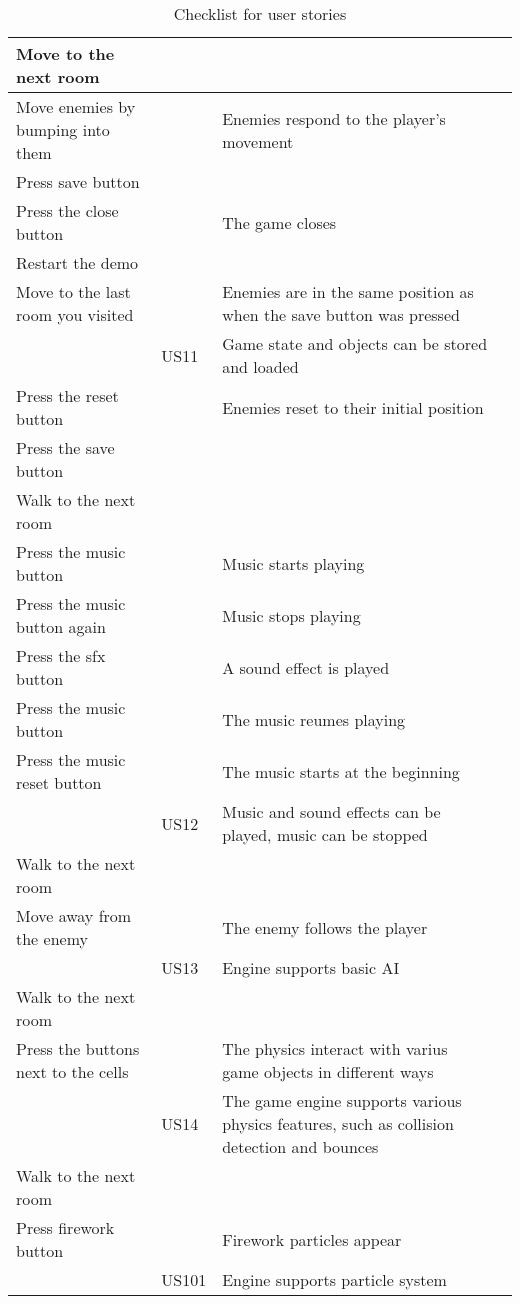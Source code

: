 \documentclass{article}
\begin{document}
\begin{table}[H]
\begin{tabular}{|p{3cm}|p{3cm}|p{6cm}|p{3cm}|}
Move to the next room & & & \\ \hline
Move enemies by bumping into them & & Enemies respond to the player's movement & \\ \hline
Press save button & & & \\ \hline
Press the close button & & The game closes & \\ \hline
Restart the demo & & & \\ \hline
Move to the last room you visited & & Enemies are in the same position as when the save button was pressed & \\ \hline
& US11 & Game state and objects can be stored and loaded & \\ \hline
Press the reset button & & Enemies reset to their initial position & \\ \hline
Press the save button & & & \\ \hline
Walk to the next room & & & \\ \hline
Press the music button & & Music starts playing & \\ \hline
Press the music button again & & Music stops playing & \\ \hline
Press the sfx button & & A sound effect is played & \\ \hline
Press the music button & & The music reumes playing & \\ \hline
Press the music reset button & & The music starts at the beginning & \\ \hline
& US12 & Music and sound effects can be played, music can be stopped & \\ \hline
Walk to the next room & & & \\ \hline
Move away from the enemy & & The enemy follows the player & \\ \hline
& US13 & Engine supports basic AI & \\ \hline
Walk to the next room & & & \\ \hline
Press the buttons next to the cells & & The physics interact with varius game objects in different ways & \\ \hline
& US14 & The game engine supports various physics features, such as collision detection and bounces & \\ \hline
Walk to the next room & & & \\ \hline
Press firework button & & Firework particles appear & \\ \hline
& US101 & Engine supports particle system & \\ \hline

\end{tabular}
\caption{Checklist for user stories}
\label{tab:user_stories}
\end{table}
\end{document}
